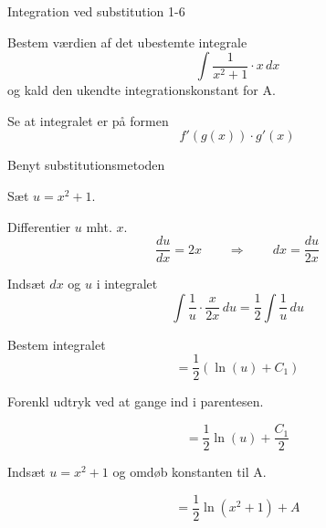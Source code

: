 \documentclass{article}
\begin{document}
\begin{exercise}{Integration ved substitution 1-6}


Bestem værdien af det ubestemte integrale
\[
\int \frac{1}{x^2 + 1}\cdot x \, dx
\]
og kald den ukendte integrationskonstant for A.




\hint

Se at integralet er på formen
\[
f'(g(x)) \cdot g'(x)
\]

\hint

Benyt substitutionsmetoden

\hint

Sæt $u=x^2 + 1$.


\hint

Differentier $u$ mht. $x$.
\[
\frac{du}{dx} = 2x \qquad\Rightarrow \qquad dx = \frac{du}{2x}
\]

\hint

Indsæt $dx$ og $u$ i integralet
\[
\int \frac{1}{u} \cdot \frac{x}{2x} \, du = \frac{1}{2} \int \frac{1}{u} \, du
\]

\hint

Bestem integralet
\[
= \frac{1}{2} \left( \ln(u) + C_1 \right)
\]

\hint
Forenkl udtryk ved at gange ind i parentesen.

\hint

\[
= \frac{1}{2} \ln(u) + \frac{C_1}{2}
\]

\hint

Indsæt $u = x^2 + 1$ og omdøb konstanten til A.

\hint

\[
= \frac{1}{2} \ln(x^2 + 1) + A
\]


\end{exercise}

\newpage
\end{document}
